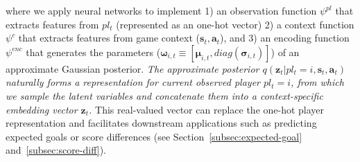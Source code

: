 \documentclass{article}
\newcommand{\context}{c}
\newcommand{\expect}{\mathbb{E}}
\newcommand{\latentvariables}{\mathbf{z}}
\newcommand{\inference}{q}
\newcommand{\state}{\mathbf{s}}
\newcommand{\action}{\mathbf{a}}
\newcommand{\player}{pl}
\newcommand{\pindex}{i}
\newcommand{\GaussianParameters}{\boldsymbol{\omega}}
\begin{document}

\noindent where we apply neural networks to implement 1) an observation function $\psi^{\player}$ that extracts features from  $\player_{t}$ (represented as an one-hot vector)
2) a context function $\psi^{\context}$ that extracts features from game context ($\state_{t},\action_{t}$), and 3) an encoding function $\psi^{enc}$ that generates the parameters ($\boldsymbol{\GaussianParameters}_{\pindex,t}\equiv[\boldsymbol{\mu}_{\pindex,t},diag(\boldsymbol{\sigma}_{\pindex,t})]$) of an approximate Gaussian posterior.
{\it The approximate posterior $\inference(\latentvariables_{t} |\player_{t}=\pindex,\state_{t},\action_{t})$ naturally forms a
representation for current observed player $\player_{t}=\pindex$, from which we sample the latent variables and concatenate them into a context-specific embedding vector $\latentvariables_{t}$.} This real-valued vector can replace the one-hot player representation and facilitates downstream applications such as predicting expected goals or score differences (see Section~\ref{subsec:expected-goal} and~\ref{subsec:score-diff}). 
\end{document}

